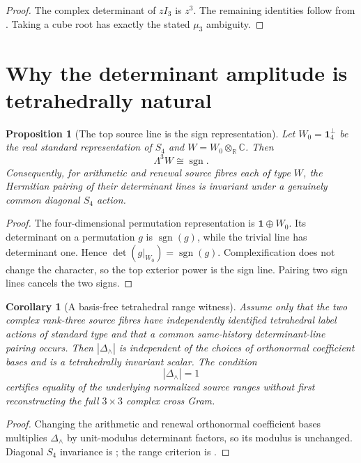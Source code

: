 \documentclass[11pt]{article}
\newtheorem{proposition}[proposition]{Proposition}
\newtheorem{corollary}[corollary]{Corollary}
\theoremstyle{definition}
\theoremstyle{remark}
\begin{document}
\begin{proof}
The complex determinant of $zI_3$ is $z^3$.  The remaining identities follow
from .  Taking a cube root has exactly the stated
$\mu_3$ ambiguity.
\end{proof}

\section{Why the determinant amplitude is tetrahedrally natural}
\label{sec:v16-s4-det}

\begin{proposition}[The top source line is the sign representation]
\label{prop:v16-sign-line}
Let $W_0=\mathbf1_4^\perp$ be the real standard representation of $S_4$ and
$W=W_0\otimes_{\mathbb R}\mathbb C$.  Then
\[
 \boxed{\Lambda^3W\cong\operatorname{sgn}.}
 \tag{V16.9}
\]
Consequently, for arithmetic and renewal source fibres each of type $W$, the
Hermitian pairing of their determinant lines is invariant under a genuinely
common diagonal $S_4$ action.
\end{proposition}

\begin{proof}
The four-dimensional permutation representation is
$\mathbf1\oplus W_0$.  Its determinant on a permutation $g$ is
$\operatorname{sgn}(g)$, while the trivial line has determinant one.  Hence
$\det(g|_{W_0})=\operatorname{sgn}(g)$.  Complexification does not change the
character, so the top exterior power is the sign line.  Pairing two sign lines
cancels the two signs.
\end{proof}

\begin{corollary}[A basis-free tetrahedral range witness]
\label{cor:v16-basisfree-det}
Assume only that the two complex rank-three source fibres have independently
identified tetrahedral label actions of standard type and that a common
same-history determinant-line pairing occurs.  Then
$|\Delta_\wedge|$ is independent of the choices of orthonormal coefficient
bases and is a tetrahedrally invariant scalar.  The condition
\[
 \boxed{|\Delta_\wedge|=1}
\]
certifies equality of the underlying normalized source ranges without first
reconstructing the full $3\times3$ complex cross Gram.
\end{corollary}

\begin{proof}
Changing the arithmetic and renewal orthonormal coefficient bases multiplies
$\Delta_\wedge$ by unit-modulus determinant factors, so its modulus is
unchanged.  Diagonal $S_4$ invariance is
; the range criterion is
.
\end{proof}
\end{document}
